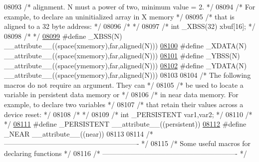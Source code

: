 \begin{DoxyCode}
08093 \textcolor{comment}{/* alignment. N must a power of two, minimum value = 2.       */}
08094 \textcolor{comment}{/* For example, to declare an uninitialized array in X memory */}
08095 \textcolor{comment}{/* that is aligned to a 32 byte address:                      */}
08096 \textcolor{comment}{/*                                                            */}
08097 \textcolor{comment}{/* int \_XBSS(32) xbuf[16];                                    */}
08098 \textcolor{comment}{/*                                                            */}
\hypertarget{a00009_source_l08099}{}\hyperlink{a00009_a126fa907a452cf251bfb5b5447d43a42}{08099} \textcolor{preprocessor}{#define \_XBSS(N)    \_\_attribute\_\_((space(xmemory),far,aligned(N)))}
\hypertarget{a00009_source_l08100}{}\hyperlink{a00009_ac1a6e2bc8e435c0104459a8c7b8377f2}{08100} \textcolor{preprocessor}{#define \_XDATA(N)   \_\_attribute\_\_((space(xmemory),far,aligned(N)))}
\hypertarget{a00009_source_l08101}{}\hyperlink{a00009_a68ddb6cce66bfc3f084c2b206517ebb8}{08101} \textcolor{preprocessor}{#define \_YBSS(N)    \_\_attribute\_\_((space(ymemory),far,aligned(N)))}
\hypertarget{a00009_source_l08102}{}\hyperlink{a00009_a62925741e70fa81d550c42ece6e43f78}{08102} \textcolor{preprocessor}{#define \_YDATA(N)   \_\_attribute\_\_((space(ymemory),far,aligned(N)))}
08103 
08104 \textcolor{comment}{/* The following macros do not require an argument. They can  */}
08105 \textcolor{comment}{/* be used to locate a variable in persistent data memory or  */}
08106 \textcolor{comment}{/* in near data memory. For example, to declare two variables */}
08107 \textcolor{comment}{/* that retain their values across a device reset:            */}
08108 \textcolor{comment}{/*                                                            */}
08109 \textcolor{comment}{/* int \_PERSISTENT var1,var2;                                 */}
08110 \textcolor{comment}{/*                                                            */}
\hypertarget{a00009_source_l08111}{}\hyperlink{a00009_a4916b19958daf3b6b9b322617cb53b44}{08111} \textcolor{preprocessor}{#define \_PERSISTENT \_\_attribute\_\_((persistent))}
\hypertarget{a00009_source_l08112}{}\hyperlink{a00009_aaa81df65726b230b5693f29eb2f3298c}{08112} \textcolor{preprocessor}{#define \_NEAR       \_\_attribute\_\_((near))}
08113 
08114 \textcolor{comment}{/* ---------------------------------------------------------- */}
08115 \textcolor{comment}{/* Some useful macros for declaring functions                 */}
08116 \textcolor{comment}{/* ---------------------------------------------------------- */}

\end{DoxyCode}
